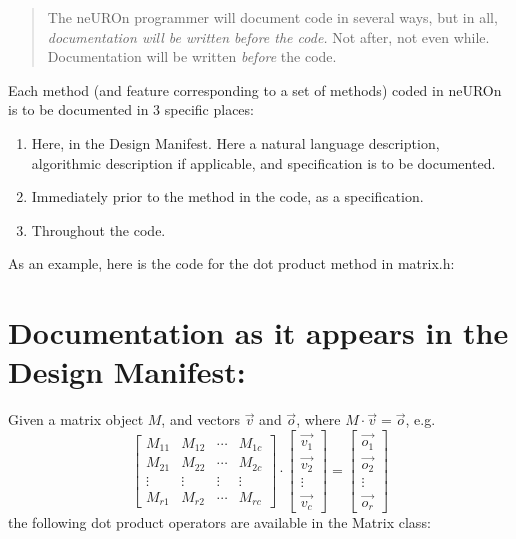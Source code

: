 \documentclass{report}
\begin{document}
\begin{quotation}
The neUROn programmer will document code in several ways, but in all,
{\em documentation will be written before the code.}  Not after, not
even while.  Documentation will be written {\em before} the code.
\end{quotation}

Each method (and feature corresponding to a set of methods) coded in
neUROn is to be documented in 3 specific places:

\begin{enumerate}
\item Here, in the Design Manifest.  Here a natural language
      description, algorithmic description if applicable, and
      specification is to be documented.
\item Immediately prior to the method in the code, as a specification.
\item Throughout the code.
\end{enumerate}

As an example, here is the code for the dot product method in
matrix.h:

\section{Documentation as it appears in the Design Manifest:}

Given a matrix object $M$, and vectors $\vec{v}$ and $\vec{o}$, where
$ M \cdot \vec{v} = \vec{o} $, e.g.
\[
\left[ \begin{array}{cccc}
	M_{11} & M_{12} & \cdots & M_{1c} \\
	M_{21} & M_{22} & \cdots & M_{2c} \\
	\vdots & \vdots & \vdots & \vdots  \\

	M_{r1} & M_{r2} & \cdots & M_{rc}
\end{array} \right]
\cdot
\left[ \begin{array}{c}
	\vec{v_{1}} \\
	\vec{v_{2}} \\
	\vdots \\
	\vec{v_{c}}
\end{array} \right]
=
\left[ \begin{array}{c}
	\vec{o_{1}} \\
	\vec{o_{2}} \\
	\vdots \\
	\vec{o_{r}}
\end{array} \right]
\]
the following dot product operators are available in the Matrix class:
\end{document}
